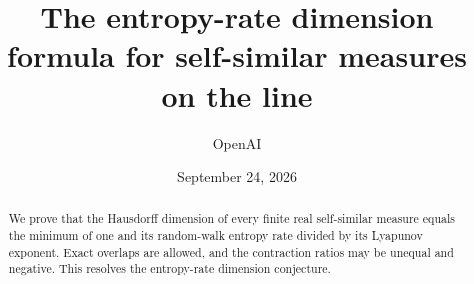 \documentclass[11pt]{article}
\title{The entropy-rate dimension formula for self-similar measures on the line}
\author{OpenAI}
\date{September 24, 2026}
\theoremstyle{definition}
\theoremstyle{remark}
\numberwithin{equation}{section}
\begin{document}
\maketitle
\begin{abstract}
We prove that the Hausdorff dimension of every finite real self-similar
measure equals the minimum of one and its random-walk entropy rate divided
by its Lyapunov exponent. Exact overlaps are allowed, and the contraction
ratios may be unequal and negative. This resolves the entropy-rate dimension
conjecture.
\end{abstract}
\tableofcontents








\end{document}
